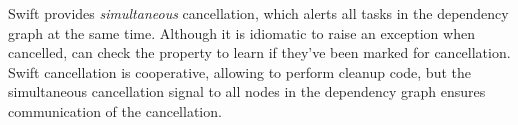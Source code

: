 Swift provides \textit{simultaneous} cancellation, which alerts all tasks in the dependency graph at the same time. Although it is idiomatic to raise an exception when cancelled, \tasks can check the property  to learn if they've been marked for cancellation. Swift cancellation is cooperative, allowing \tasks to perform cleanup code, but the simultaneous cancellation signal to all nodes in the dependency graph ensures communication of the cancellation.
